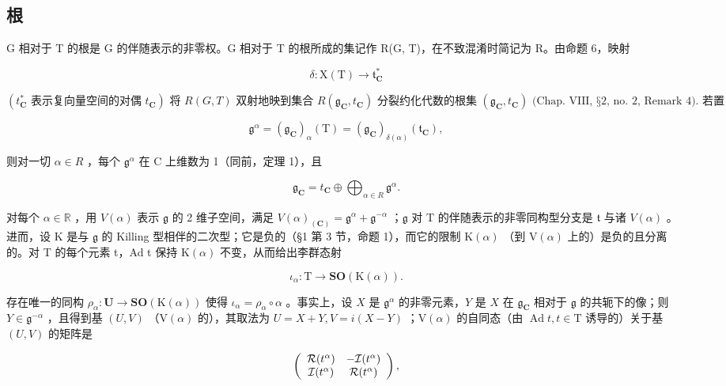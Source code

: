 \subsection{根}

G 相对于 T 的根是 G 的伴随表示的非零权。G 相对于 T 的根所成的集记作 R(G, T)，在不致混淆时简记为 R。由命题 6，映射

\[
\delta : \mathrm{X(T)} \to \mathfrak {t} _ {\mathbf {C}} ^ {*}
\]

\((t_{\mathbf{C}}^{*} \text{ 表示复向量空间的对偶 } t_{\mathbf{C}}) \text{ 将 } R(G, T) \text{ 双射地映到集合 } R(\mathfrak{g}_{\mathbf{C}}, t_{\mathbf{C}}) \text{ 分裂约化代数的根集 } (\mathfrak{g}_{\mathbf{C}}, t_{\mathbf{C}}) \text{ (Chap. VIII, §2, no. 2, Remark 4). 若置}\)

\[
\mathfrak {g} ^ {\alpha} = (\mathfrak {g} _ {\mathbf {C}}) _ {\alpha} (\mathrm{T}) = (\mathfrak {g} _ {\mathbf {C}}) _ {\delta (\alpha)} (\mathfrak {t} _ {\mathbf {C}}),\tag{11}
\]

则对一切 \(\alpha\in R\) ，每个 \(\mathfrak{g}^{\alpha}\) 在 C 上维数为 1（同前，定理 1），且

\[
\mathfrak {g} _ {\mathbf {C}} = t _ {\mathbf {C}} \oplus \bigoplus_ {\alpha \in R} \mathfrak {g} ^ {\alpha}.\tag{12}
\]

对每个 \(\alpha \in \mathbb{R}\) ，用 \(V(\alpha)\) 表示 \(\mathfrak{g}\) 的 2 维子空间，满足 \(V(\alpha)_{(\mathbf{C})} = \mathfrak{g}^{\alpha} + \mathfrak{g}^{-\alpha}\) ；\(\mathfrak{g}\) 对 T 的伴随表示的非零同构型分支是 \(\mathfrak{t}\) 与诸 \(V(\alpha)\) 。进而，设 K 是与 \(\mathfrak{g}\) 的 Killing 型相伴的二次型；它是负的（§1 第 3 节，命题 1），而它的限制 \(\mathrm{K}(\alpha)\) （到 \(\mathrm{V}(\alpha)\) 上的）是负的且分离的。对 T 的每个元素 t，Ad t 保持 \(\mathrm{K}(\alpha)\) 不变，从而给出李群态射

\[
\iota_ {\alpha}: \mathrm{T} \to \mathbf {S O} (\mathrm{K} (\alpha)).
\]

存在唯一的同构 \(\rho_{\alpha}:\mathbf{U}\to \mathbf{SO}(\mathrm{K}(\alpha))\) 使得 \(\iota_{\alpha} = \rho_{\alpha}\circ \alpha\) 。事实上，设 \(X\) 是 \(\mathfrak{g}^{\alpha}\) 的非零元素，\(Y\) 是 \(X\) 在 \(\mathfrak{g}_{\mathbf{C}}\) 相对于 \(\mathfrak{g}\) 的共轭下的像；则 \(Y\in \mathfrak{g}^{-\alpha}\) ，且得到基 \((U,V)\) （\(\mathrm{V}(\alpha)\) 的），其取法为 \(U = X + Y,V = i(X - Y)\) ；\(\mathrm{V}(\alpha)\) 的自同态（由 \(\operatorname {Ad}t,t\in \mathrm{T}\) 诱导的）关于基 \((U,V)\) 的矩阵是

\[
\left( \begin{array}{c c} \mathcal {R} (t ^ {\alpha}) & - \mathcal {I} (t ^ {\alpha}) \\ \mathcal {I} (t ^ {\alpha}) & \mathcal {R} (t ^ {\alpha}) \end{array} \right),
\]

